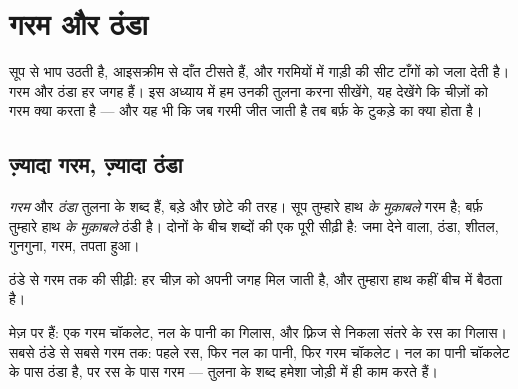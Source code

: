 \chapter{गरम और ठंडा}\label{ch:g1:hot-and-cold}

सूप से भाप उठती है, आइसक्रीम से दाँत टीसते हैं, और गरमियों में गाड़ी
की सीट टाँगों को जला देती है। गरम और ठंडा हर जगह हैं। इस अध्याय में हम
उनकी तुलना करना सीखेंगे, यह देखेंगे कि चीज़ों को गरम क्या करता है ---
और यह भी कि जब गरमी जीत जाती है तब बर्फ़ के टुकड़े का क्या होता है।

\section{ज़्यादा गरम, ज़्यादा ठंडा}

\begin{definition}[गरम और ठंडा]\label{def:g1:hot-and-cold:words}
\emph{गरम} और \emph{ठंडा} तुलना के शब्द हैं,
बड़े और छोटे की तरह। सूप तुम्हारे हाथ \emph{के मुक़ाबले} गरम है; बर्फ़
तुम्हारे हाथ \emph{के मुक़ाबले} ठंडी है। दोनों के बीच शब्दों की एक पूरी
सीढ़ी है: जमा देने वाला, ठंडा, शीतल, गुनगुना, गरम, तपता हुआ।
\end{definition}

\begin{omfigure}

{\small ठंडे से गरम तक की सीढ़ी: हर चीज़ को अपनी जगह मिल जाती है, और
तुम्हारा हाथ कहीं बीच में बैठता है।}
\end{omfigure}

\begin{example}[तीन पेय क्रम में]\label{ex:g1:hot-and-cold:drinks}
मेज़ पर हैं: एक गरम चॉकलेट, नल के पानी का गिलास, और फ़्रिज से निकला
संतरे के रस का गिलास। सबसे ठंडे से सबसे गरम तक: पहले रस, फिर नल का
पानी, फिर गरम चॉकलेट। नल का पानी चॉकलेट के पास ठंडा है, पर रस के पास
गरम --- तुलना के शब्द हमेशा जोड़ी में ही काम करते हैं।
\end{example}

